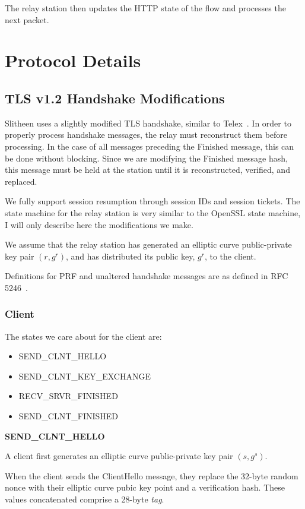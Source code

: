 \documentclass[11pt]{article}
\theoremstyle{definittion}
\begin{document}
The relay station then updates the HTTP state of the flow and processes the next packet.

\section{Protocol Details}

\subsection{TLS v1.2 Handshake Modifications}

Slitheen uses a slightly modified TLS handshake, similar to Telex~\cite{wustrow2011}. In order to properly process handshake messages, the relay must reconstruct them before processing. In the case of all messages preceding the Finished message, this can be done without blocking. Since we are modifying the Finished message hash, this message must be held at the station until it is reconstructed, verified, and replaced.

We fully support session resumption through session IDs and session tickets. The state machine for the relay station is very similar to the OpenSSL state machine, I will only describe here the modifications we make.

We assume that the relay station has generated an elliptic curve public-private key pair $(r, g^r)$, and has distributed its public key, $g^r$, to the client. %

Definitions for PRF and unaltered handshake messages are as defined in RFC 5246~\cite{rfc5246}.

\subsubsection{Client}

The states we care about for the client are:
\begin{itemize}
\item SEND\_CLNT\_HELLO
\item SEND\_CLNT\_KEY\_EXCHANGE
\item RECV\_SRVR\_FINISHED
\item SEND\_CLNT\_FINISHED
\end{itemize}

\textbf{SEND\_CLNT\_HELLO}

A client first generates an elliptic curve public-private key pair $(s, g^s)$.

When the client sends the ClientHello message, they replace the 32-byte random nonce with their elliptic curve pubic key point and a verification hash. These values concatenated comprise a 28-byte \emph{tag}.
\end{document}
